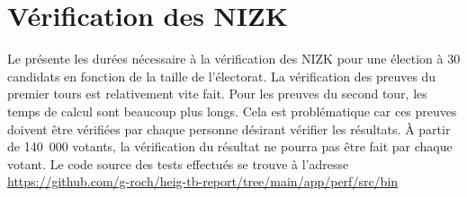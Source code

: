\documentclass[../report]{subfiles}
\begin{document}
\section{Vérification des NIZK}

Le  présente les durées nécessaire à la vérification des NIZK pour une élection à 30 candidats en fonction 
de la taille de l'électorat.
La vérification des preuves du premier tours est relativement vite fait.
Pour les preuves du second tour, les temps de calcul sont beaucoup plus longs.
Cela est problématique car ces preuves doivent être vérifiées par chaque personne désirant vérifier les résultats.
À partir de 140~000 votants, la vérification du résultat ne pourra pas être fait par chaque votant.
Le code source des tests effectués se trouve à l'adresse \url{https://github.com/g-roch/heig-tb-report/tree/main/app/perf/src/bin}
\end{document}
